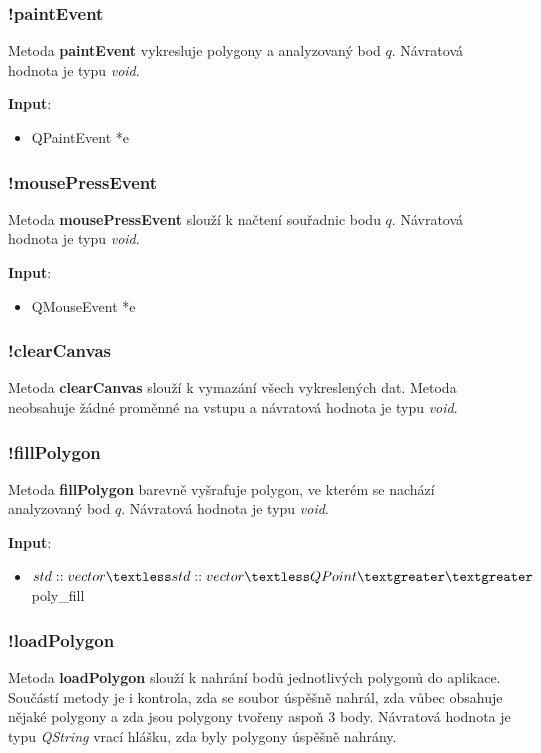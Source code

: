 \documentclass[a4paper, 12pt]{article}
\begin{document}
\subsubsection{!paintEvent}
Metoda \textbf{paintEvent} vykresluje polygony a analyzovaný bod $q$. Návratová hodnota je typu \textsl{void}.

\textbf{Input}:
\begin{itemize}
\item QPaintEvent *e
\end{itemize}

\subsubsection{!mousePressEvent}
Metoda \textbf{mousePressEvent} slouží k načtení souřadnic bodu $q$. Návratová hodnota je typu \textsl{void}.

\textbf{Input}:
\begin{itemize}
\item QMouseEvent *e
\end{itemize}

\subsubsection{!clearCanvas}
Metoda \textbf{clearCanvas} slouží k vymazání všech vykreslených dat. Metoda neobsahuje žádné proměnné na vstupu a návratová hodnota je typu \textsl{void}.

\subsubsection{!fillPolygon}
Metoda \textbf{fillPolygon} barevně vyšrafuje polygon, ve kterém se nachází analyzovaný bod $q$. Návratová hodnota je typu \textsl{void}.

\textbf{Input}:
\begin{itemize}
\item $std::vector\textless std::vector\textless QPoint\textgreater \textgreater$ poly\_fill
\end{itemize}

\subsubsection{!loadPolygon}
Metoda \textbf{loadPolygon} slouží k nahrání bodů jednotlivých polygonů do aplikace.  Součástí metody je i kontrola, zda se soubor úspěšně nahrál, zda vůbec obsahuje nějaké polygony a zda jsou polygony tvořeny aspoň 3 body. Návratová hodnota je typu \textsl{QString} vrací hlášku, zda byly polygony úspěšně nahrány.
\end{document}
